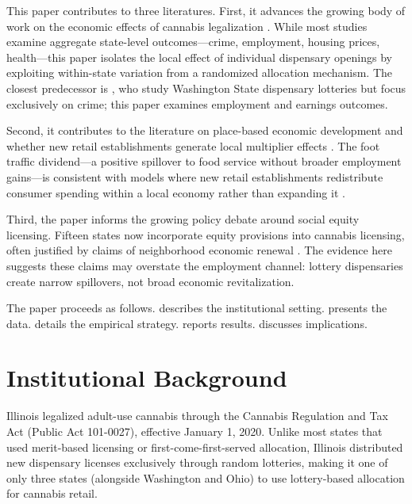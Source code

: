 \documentclass[12pt]{article}
\begin{document}
This paper contributes to three literatures. First, it advances the growing body of work on the economic effects of cannabis legalization \citep{Hansen2020, Dragone2019, Sabia2023, Nicholas2023, Chakraborty2024, Burkhardt2023}. While most studies examine aggregate state-level outcomes---crime, employment, housing prices, health---this paper isolates the local effect of individual dispensary openings by exploiting within-state variation from a randomized allocation mechanism. The closest predecessor is \citet{Burkhardt2023}, who study Washington State dispensary lotteries but focus exclusively on crime; this paper examines employment and earnings outcomes.

Second, it contributes to the literature on place-based economic development and whether new retail establishments generate local multiplier effects \citep{Moretti2010, Neumark2011}. The foot traffic dividend---a positive spillover to food service without broader employment gains---is consistent with models where new retail establishments redistribute consumer spending within a local economy rather than expanding it \citep{Basker2007, Ioana2021}.

Third, the paper informs the growing policy debate around social equity licensing. Fifteen states now incorporate equity provisions into cannabis licensing, often justified by claims of neighborhood economic renewal \citep{Hockett2023}. The evidence here suggests these claims may overstate the employment channel: lottery dispensaries create narrow spillovers, not broad economic revitalization.

The paper proceeds as follows.  describes the institutional setting.  presents the data.  details the empirical strategy.  reports results.  discusses implications.


\section{Institutional Background}
\label{sec:background}

Illinois legalized adult-use cannabis through the Cannabis Regulation and Tax Act (Public Act 101-0027), effective January 1, 2020. Unlike most states that used merit-based licensing or first-come-first-served allocation, Illinois distributed new dispensary licenses exclusively through random lotteries, making it one of only three states (alongside Washington and Ohio) to use lottery-based allocation for cannabis retail.
\end{document}
